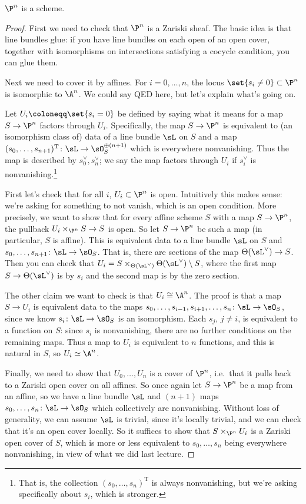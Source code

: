 \begin{thm}
$\P^n$ is a scheme.
\end{thm}
\begin{proof}
First we need to check that $\P^n$ is a Zariski sheaf. The basic idea is that line bundles glue: if you have line
bundles on each open of an open cover, together with isomorphisms on intersections satisfying a cocycle condition,
you can glue them.

Next we need to cover it by affines. For $i = 0,\dotsc,n$, the locus $\set{s_i\ne 0}\subset\P^n$ is isomorphic to
$\A^n$. We could say QED here, but let's explain what's going on.

Let $U_i\coloneqq\set{s_i = 0}$ be defined by saying what it means for a map $S\to\P^n$ factors through $U_i$.
Specifically, the map $S\to\P^n$ is equivalent to (an isomorphism class of) data of a line bundle $\sL$ on $S$ and
a map $(s_0,\dotsc,s_{n+1})^{\mathrm T}\colon\sL\to\sO_S^{\oplus(n+1)}$ which is everywhere nonvanishing. Thus the
map is described by $s_0^\vee,s_n^\vee$; we say the map factors through $U_i$ if $s_i^\vee$ is
nonvanishing.\footnote{That is, the collection $(s_0,\dotsc,s_n)^{\mathrm T}$ is always nonvanishing, but we're
asking specifically about $s_i$, which is stronger.}

First let's check that for all $i$, $U_i\subset\P^n$ is open. Intuitively this makes sense: we're asking for
something to not vanish, which is an open condition. More precisely, we want to show that for every affine scheme
$S$ with a map $S\to\P^n$, the pullback $U_i\times_{\P^n}S\to S$ is open. So let $S\to\P^n$ be such a map (in
particular, $S$ is affine). This is equivalent data to a line bundle $\sL$ on $S$ and
$s_0,\dotsc,s_{n+1}\colon\sL\to\sO_S$. That is, there are sections of the map $\Theta(\sL^\vee)\to S$. Then you can
check that $U_i = S\times_{\Theta(\sL^\vee)} \Theta(\sL^\vee)\setminus S$, where the first map
$S\to\Theta(\sL^\vee)$ is by $s_i$ and the second map is by the zero section.

The other claim we want to check is that $U_i\cong\A^n$. The proof is that a map $S\to U_i$ is equivalent data to
the maps $s_0,\dotsc,s_{i-1},s_{i+1},\dotsc,s_n\colon\sL\to\sO_S$, since we know $s_i\colon\sL\to\sO_S$ is an
isomorphism. Each $s_j$, $j\ne i$, is equivalent to a function on $S$: since $s_i$ is nonvanishing, there are no
further conditions on the remaining maps. Thus a map to $U_i$ is equivalent to $n$ functions, and this is natural
in $S$, so $U_i\simeq\A^n$.

Finally, we need to show that $U_0,\dotsc,U_n$ is a cover of $\P^n$, i.e.\ that it pulls back to a Zariski open
cover on all affines. So once again let $S\to\P^n$ be a map from an affine, so we have a line bundle $\sL$ and
$(n+1)$ maps $s_0,\dotsc,s_n\colon\sL\to\sO_S$ which collectively are nonvanishing. Without loss of generality, we
can assume $\sL$ is trivial, since it's locally trivial, and we can check that it's an open cover locally. So it
suffices to show that $S\times_{\P^n} U_i$ is a Zariski open cover of $S$, which is more or less equivalent to
$s_0,\dotsc,s_n$ being everywhere nonvanishing, in view of what we did last lecture.
\end{proof}
